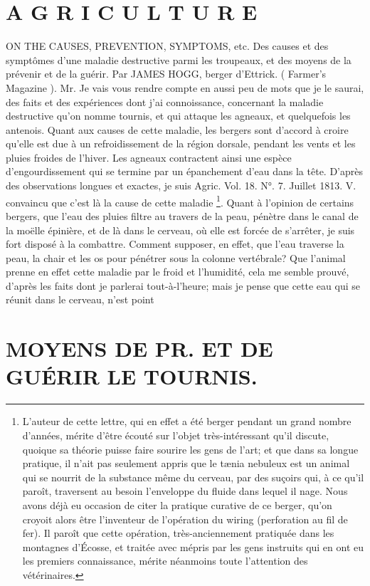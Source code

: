 \setcounter{page}{241} \section{A G R I C U L T U R E}
ON THE CAUSES, PREVENTION, SYMPTOMS, etc.
Des causes et des symptômes d'une maladie destructive parmi les troupeaux, et des moyens de la prévenir et de la guérir. Par JAMES HOGG, berger d'Ettrick.
( Farmer's Magazine ).
Mr.
Je vais vous rendre compte en aussi peu de mots que je le saurai, des faits et des expériences dont j'ai connoissance, concernant la maladie destructive qu'on nomme tournis, et qui attaque les agneaux, et quelquefois les antenois.
Quant aux causes de cette maladie, les bergers sont d'accord à croire qu'elle est due à un refroidissement de la région dorsale, pendant les vents et les pluies froides de l'hiver. Les agneaux contractent ainsi une espèce d'engourdissement qui se termine par un épanchement d'eau dans la tête. D'après des observations longues et exactes, je suis
Agric. Vol. 18. N°. 7. Juillet 1813. V.\setcounter{page}{242} convaincu que c'est là la cause de cette maladie \footnote{L'auteur de cette lettre, qui en effet a été berger pendant un grand nombre d'années, mérite d'être écouté sur l'objet très-intéressant qu'il discute, quoique sa théorie puisse faire sourire les gens de l'art; et que dans sa longue pratique, il n'ait pas seulement appris que le tænia nebuleux est un animal qui se nourrit de la substance même du cerveau, par des suçoirs qui, à ce qu'il paroît, traversent au besoin l'enveloppe du fluide dans lequel il nage. Nous avons déjà eu occasion de citer la pratique curative de ce berger, qu'on croyoit alors être l'inventeur de l'opération du wiring (perforation au fil de fer). Il paroît que cette opération, très-anciennement pratiquée dans les montagnes d'Écosse, et traitée avec mépris par les gens instruits qui en ont eu les premiers connaissance, mérite néanmoins toute l'attention des vétérinaires.}. Quant à l'opinion de certains bergers, que l'eau des pluies filtre au travers de la peau, pénètre dans le canal de la moëlle épinière, et de là dans le cerveau, où elle est forcée de s'arrêter, je suis fort disposé à la combattre. Comment supposer, en effet, que l'eau traverse la peau, la chair et les os pour pénétrer sous la colonne vertébrale? Que l'animal prenne en effet cette maladie par le froid et l'humidité, cela me semble prouvé, d'après les faits dont je parlerai tout-à-l'heure; mais je pense que cette eau qui se réunit dans le cerveau, n'est point\setcounter{page}{243} \section{MOYENS DE PR. ET DE GUÉRIR LE TOURNIS.}
